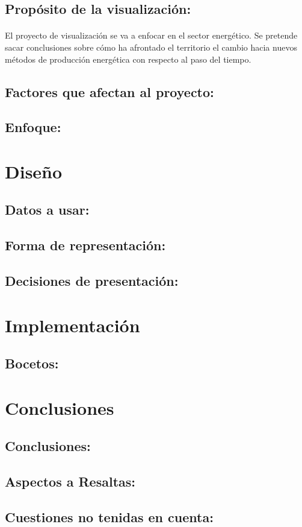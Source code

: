 \documentclass{article}
\begin{document}
		\subsection{Propósito de la visualización:}
	
			\paragraph{}
			El proyecto de visualización se va a enfocar en el sector energético. Se pretende sacar conclusiones sobre cómo ha afrontado el territorio el cambio hacia nuevos métodos de producción energética con respecto al paso del tiempo.


		\subsection{Factores que afectan al proyecto:}


		\subsection{Enfoque:}


	\section{Diseño}
	
		\subsection{Datos a usar:}
		
	
		\subsection{Forma de representación:}
		
	
		\subsection{Decisiones de presentación:}


	\section{Implementación}

		\subsection{Bocetos:}

	
	\section{Conclusiones}
	
		\subsection{Conclusiones:}
	
	
		\subsection{Aspectos a Resaltas:}
	
	
		\subsection{Cuestiones no tenidas en cuenta:}
\end{document}
